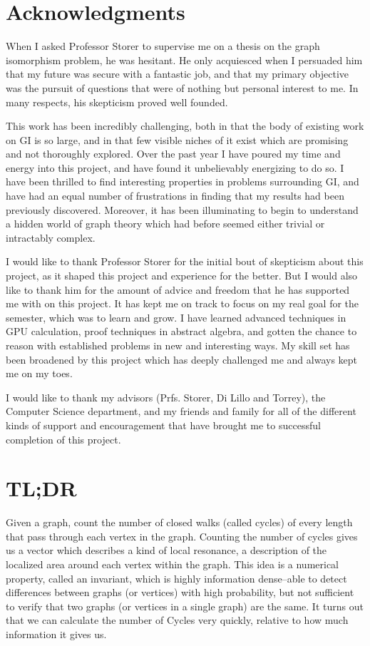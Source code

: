 \chapter*{Acknowledgments}

When I asked Professor Storer to supervise me on a thesis on the graph isomorphism problem, he was hesitant.
He only acquiesced when I persuaded him that my future was secure with a fantastic job, and that my primary objective was the pursuit of questions that were of nothing but personal interest to me.
In many respects, his skepticism proved well founded.

This work has been incredibly challenging, both in that the body of existing work on GI is so large, and in that few visible niches of it exist which are promising and not thoroughly explored.
Over the past year I have poured my time and energy into this project, and have found it unbelievably energizing to do so.
I have been thrilled to find interesting properties in problems surrounding GI, and have had an equal number of frustrations in finding that my results had been previously discovered.
Moreover, it has been illuminating to begin to understand a hidden world of graph theory which had before seemed either trivial or intractably complex.

I would like to thank Professor Storer for the initial bout of skepticism about this project, as it shaped this project and experience for the better.
But I would also like to thank him for the amount of advice and freedom that he has supported me with on this project.
It has kept me on track to focus on my real goal for the semester, which was to learn and grow.
I have learned advanced techniques in GPU calculation, proof techniques in abstract algebra, and gotten the chance to reason with established problems in new and interesting ways.
My skill set has been broadened by this project which has deeply challenged me and always kept me on my toes.

I would like to thank my advisors (Prfs. Storer, Di Lillo and Torrey), the Computer Science department, and my friends and family for all of the different kinds of support and encouragement that have brought me to successful completion of this project.

\chapter*{TL;DR}

Given a graph, count the number of closed walks (called cycles) of every length that pass through each vertex in the graph.
Counting the number of cycles gives us a vector which describes a kind of local resonance, a description of the localized area around each vertex within the graph.
This idea is a numerical property, called an invariant, which is highly information dense--able to detect differences between graphs (or vertices) with high probability, but not sufficient to verify that two graphs (or vertices in a single graph) are the same.
It turns out that we can calculate the number of Cycles very quickly, relative to how much information it gives us.

